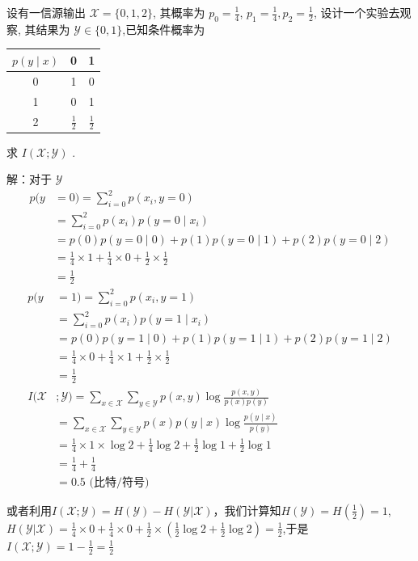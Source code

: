 \begin{example}
    设有一信源输出 $ \mathscr{X}=\{0,1,2\} $, 其概率为 $ p_{0}=\frac{1}{4} $, $ p_{1}=\frac{1}{4}, p_{2}=\frac{1}{2} $, 设计一个实验去观察, 其结果为 $ \mathscr{Y} \in\{0,1\} $,已知条件概率为
    \begin{table}[h]
        \centering
\begin{tabular}{c|c|c}
\hline$ p(y \mid x) $ & 0 & 1 \\
\hline 0 & 1 & 0 \\
\hline 1 & 0 & 1 \\
\hline 2 & $ \frac{1}{2} $ & $ \frac{1}{2} $ \\
\hline
\end{tabular}
\end{table}
求 $ I(\mathscr{X} ; \mathscr{Y}) $ .

解：对于 $ \mathscr{Y} $
$$
\begin{aligned}
p(y & =0)=\sum_{i=0}^{2} p\left(x_{i}, y=0\right) \\
& =\sum_{i=0}^{2} p\left(x_{i}\right) p\left(y=0 \mid x_{i}\right) \\
& =p(0) p(y=0 \mid 0)+p(1) p(y=0 \mid 1)+p(2) p(y=0 \mid 2) \\
& =\frac{1}{4} \times 1+\frac{1}{4} \times 0+\frac{1}{2} \times \frac{1}{2} \\
& =\frac{1}{2}
\end{aligned}
$$
$$ \begin{aligned} p(y & =1)=\sum_{i=0}^{2} p\left(x_{i}, y=1\right) \\ & =\sum_{i=0}^{2} p\left(x_{i}\right) p\left(y=1 \mid x_{i}\right) \\ & =p(0) p(y=1 \mid 0)+p(1) p(y=1 \mid 1)+p(2) p(y=1 \mid 2) \\ & =\frac{1}{4} \times 0+\frac{1}{4} \times 1+\frac{1}{2} \times \frac{1}{2} \\ & =\frac{1}{2} \\ I(\mathscr{X} & ; \mathscr{Y})=\sum_{x \in \mathscr{X}} \sum_{y \in \mathscr{Y}} p(x, y) \log \frac{p(x, y)}{p(x) p(y)} \\ & =\sum_{x \in \mathscr{X}} \sum_{y \in \mathscr{Y}} p(x) p(y \mid x) \log \frac{p(y \mid x)}{p(y)} \\ & =\frac{1}{4} \times 1 \times \log 2+\frac{1}{4} \log 2+\frac{1}{2} \log 1+\frac{1}{2} \log 1 \\ & =\frac{1}{4}+\frac{1}{4} \\ & =0.5 \text { (比特/符号) }\end{aligned} $$

或者利用$I(\mathscr{X}  ; \mathscr{Y})=H( \mathscr{Y})-H( \mathscr{Y}| \mathscr{X})$，我们计算知$H( \mathscr{Y})=H(\frac 12)=1$,$H( \mathscr{Y}| \mathscr{X})=\frac 14\times 0+\frac 14\times 0+\frac12\times(\frac 12\log 2+\frac 12\log 2)=\frac 12$,于是$I(\mathscr{X}  ; \mathscr{Y})=1-\frac 12=\frac 12$
\end{example}
